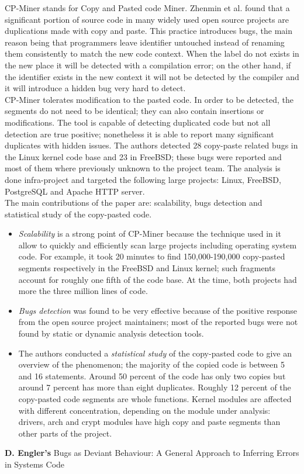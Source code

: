 CP-Miner stands for Copy and Pasted code Miner. Zhenmin et al. found that a significant portion of source code in many widely used open source projects are duplications made with copy and paste. This practice introduces bugs, the main reason being that programmers leave identifier untouched instead of renaming them consistently to match the new code context. When the label do not exists in the new place it will be detected with a compilation error; on the other hand, if the identifier exists in the new context it will not be detected by the compiler and it will introduce a hidden bug very hard to detect.\\
CP-Miner tolerates modification to the pasted code. In order to be detected, the segments do not need to be identical; they can also contain insertions or modifications. The tool is capable of detecting duplicated code but not all detection are true positive; nonetheless it is able to report many significant duplicates with hidden issues. The authors detected 28 copy-paste related bugs in the Linux kernel code base and 23 in FreeBSD; these bugs were reported and most of them where previously unknown to the project team.
The analysis is done infra-project and targeted the following large projects: Linux, FreeBSD, PostgreSQL and Apache HTTP server.
\\
The main contributions of the paper are: scalability, bugs detection and statistical study of the copy-pasted code. 
\begin{itemize}
    \item \emph{Scalability} is a strong point of CP-Miner because the technique used in it allow to quickly and efficiently scan large projects including operating system code. For example, it took 20 minutes to find 150,000-190,000 copy-pasted segments respectively in the FreeBSD and Linux kernel; such fragments account for roughly one fifth of the code base. At the time, both projects had more the three million lines of code. 
    \item \emph{Bugs detection} was found to be very effective because of the positive response from the open source project maintainers; most of the reported bugs were not found by static or dynamic analysis detection tools. 
    \item The authors conducted a \emph{statistical study} of the copy-pasted code to give an overview of the phenomenon; the majority of the copied code is between 5 and 16 statements. Around 50 percent of the code has only two copies but around 7 percent has more than eight duplicates. Roughly 12 percent of the copy-pasted code segments are whole functions. Kernel modules are affected with different concentration, depending on the module under analysis: drivers, arch and crypt modules have high copy and paste segments than other parts of the project.
\end{itemize}
\textbf{D. Engler's} \cite{engler2001bugs} Bugs as Deviant Behaviour: A General Approach to Inferring Errors in Systems Code

